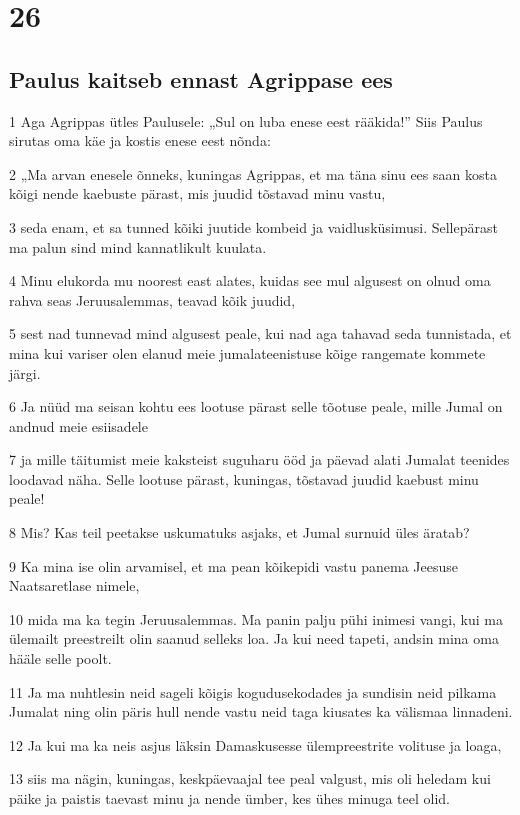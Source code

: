 \chapter{26}

\section*{Paulus kaitseb ennast Agrippase ees}

\par 1 Aga Agrippas ütles Paulusele: „Sul on luba enese eest rääkida!” Siis Paulus sirutas oma käe ja kostis enese eest nõnda:
\par 2 „Ma arvan enesele õnneks, kuningas Agrippas, et ma täna sinu ees saan kosta kõigi nende kaebuste pärast, mis juudid tõstavad minu vastu,
\par 3 seda enam, et sa tunned kõiki juutide kombeid ja vaidlusküsimusi. Sellepärast ma palun sind mind kannatlikult kuulata.
\par 4 Minu elukorda mu noorest east alates, kuidas see mul algusest on olnud oma rahva seas Jeruusalemmas, teavad kõik juudid,
\par 5 sest nad tunnevad mind algusest peale, kui nad aga tahavad seda tunnistada, et mina kui variser olen elanud meie jumalateenistuse kõige rangemate kommete järgi.
\par 6 Ja nüüd ma seisan kohtu ees lootuse pärast selle tõotuse peale, mille Jumal on andnud meie esiisadele
\par 7 ja mille täitumist meie kaksteist suguharu ööd ja päevad alati Jumalat teenides loodavad näha. Selle lootuse pärast, kuningas, tõstavad juudid kaebust minu peale!
\par 8 Mis? Kas teil peetakse uskumatuks asjaks, et Jumal surnuid üles äratab?
\par 9 Ka mina ise olin arvamisel, et ma pean kõikepidi vastu panema Jeesuse Naatsaretlase nimele,
\par 10 mida ma ka tegin Jeruusalemmas. Ma panin palju pühi inimesi vangi, kui ma ülemailt preestreilt olin saanud selleks loa. Ja kui need tapeti, andsin mina oma hääle selle poolt.
\par 11 Ja ma nuhtlesin neid sageli kõigis kogudusekodades ja sundisin neid pilkama Jumalat ning olin päris hull nende vastu neid taga kiusates ka välismaa linnadeni.
\par 12 Ja kui ma ka neis asjus läksin Damaskusesse ülempreestrite volituse ja loaga,
\par 13 siis ma nägin, kuningas, keskpäevaajal tee peal valgust, mis oli heledam kui päike ja paistis taevast minu ja nende ümber, kes ühes minuga teel olid.
